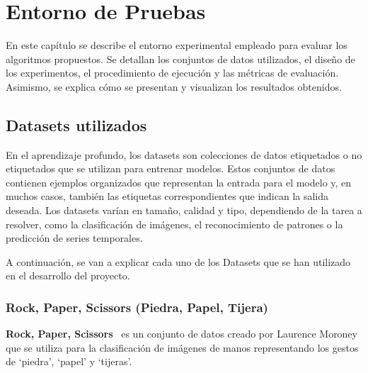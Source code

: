 
\chapter{Entorno de Pruebas}\label{ch:entorno_de_pruebas}
En este capítulo se describe el entorno experimental empleado para evaluar los algoritmos propuestos.
Se detallan los conjuntos de datos utilizados, el diseño de los experimentos, el procedimiento de ejecución y las métricas de evaluación.
Asimismo, se explica cómo se presentan y visualizan los resultados obtenidos.


\section{Datasets utilizados}\label{sec:datasets}
En el aprendizaje profundo, los datasets son colecciones de datos etiquetados o no etiquetados que se utilizan para
entrenar modelos.
Estos conjuntos de datos contienen ejemplos organizados que representan la entrada para el modelo y, en muchos casos,
también las etiquetas correspondientes que indican la salida deseada.
Los datasets varían en tamaño, calidad y tipo, dependiendo de la tarea a resolver, como la clasificación de imágenes,
el reconocimiento de patrones o la predicción de series temporales.


A continuación, se van a explicar cada uno de los Datasets que se han utilizado en el desarrollo del proyecto.

\subsection{Rock, Paper, Scissors (Piedra, Papel, Tijera)}\label{subsec:rock-paper-scissors}
\textbf{Rock, Paper, Scissors}~\cite{RockPaperScissors} es un conjunto de datos creado por Laurence Moroney
que se utiliza para la clasificación de imágenes de manos representando los gestos de `piedra', `papel' y `tijeras'.

